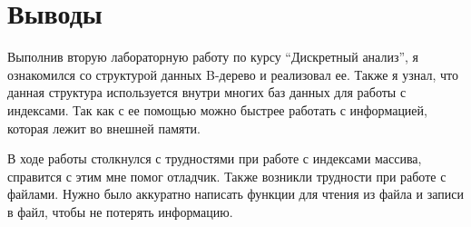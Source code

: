 \section{Выводы}

Выполнив вторую лабораторную работу по курсу \enquote{Дискретный анализ}, 
я ознакомился со структурой данных B-дерево и реализовал ее. Также я узнал, 
что данная структура используется внутри многих баз данных для работы с индексами. 
Так как с ее помощью можно быстрее работать с информацией, которая лежит во внешней памяти.

В ходе работы столкнулся с трудностями при работе с индексами массива, справится с этим мне помог отладчик.
Также возникли трудности при работе с файлами. 
Нужно было аккуратно написать функции для чтения из файла и записи в файл, чтобы не потерять информацию.
\pagebreak